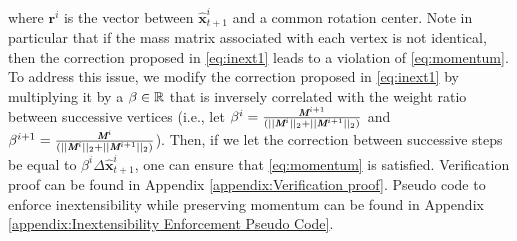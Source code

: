 where $\textbf{r}^i$ is the vector between $\hat{\textbf{x}}^i_{t+1}$ and a common rotation center.
Note in particular that if the mass matrix associated with each vertex is not identical, then the correction proposed in \eqref{eq:inext1} leads to a violation of \eqref{eq:momentum}.
To address this issue, we modify the correction proposed in \eqref{eq:inext1} by multiplying it by a $\beta \in \mathbb{R}$ that is inversely correlated with the weight ratio between successive vertices (i.e., let  $\beta^{i} = \frac{\textit{\textbf{M}}^{i+1}}{(||\textit{\textbf{M}}^{i}||_2+||\textit{\textbf{M}}^{i+1}||_2)}$ and $\beta^{i+1} = \frac{\textit{\textbf{M}}^{i}}{(||\textit{\textbf{M}}^{i}||_2 + ||\textit{\textbf{M}}^{i+1}||_2)}$).
Then, if we let the correction between successive steps be equal to $\beta^i \Delta \hat{\textbf{x}}^i_{t+1}$, one can ensure that \eqref{eq:momentum} is satisfied. 
Verification proof can be found in Appendix \ref{appendix:Verification proof}.
Pseudo code to enforce inextensibility while preserving momentum can be found in Appendix \ref{appendix:Inextensibility Enforcement Pseudo Code}. 






